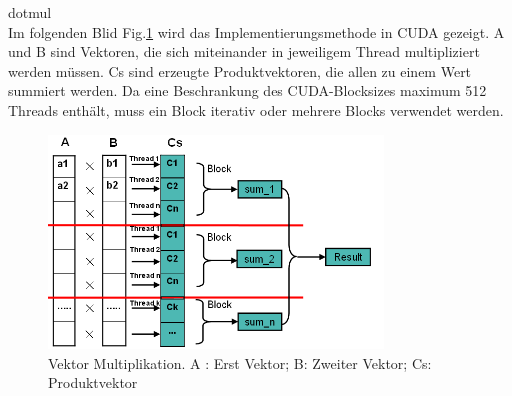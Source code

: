 dotmul\\
Im folgenden Blid Fig.\ref{Vektor} wird das Implementierungsmethode in CUDA gezeigt. A und B sind Vektoren, die sich miteinander in jeweiligem Thread multipliziert werden müssen. Cs sind erzeugte Produktvektoren, die allen zu einem Wert summiert werden. Da eine Beschrankung des CUDA-Blocksizes maximum 512 Threads enthält, muss ein Block iterativ oder mehrere Blocks verwendet werden.

\begin{figure}[htbp]
\includegraphics[width=3.5in]{.//pic//Vektor}
\caption{Vektor Multiplikation. A : Erst Vektor; B: Zweiter Vektor; Cs: Produktvektor}
\label{Vektor} 
\end{figure}